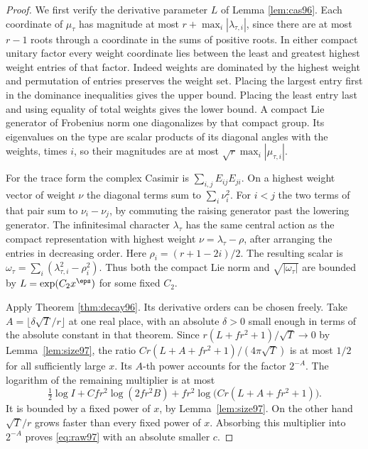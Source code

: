 \documentclass[a4paper,11pt]{article}
\theoremstyle{definition}
\theoremstyle{remark}
\numberwithin{equation}{section}
\begin{document}
\begin{proof}
We first verify the derivative parameter \(L\) of Lemma \ref{lem:cas96}. Each coordinate of \(\mu_\tau\) has magnitude at most
\(r+\max_i|\lambda_{\tau,i}|\), since there are at most \(r-1\)
roots through a coordinate in the sums of positive roots.
In either compact unitary factor every weight coordinate lies
between the least and greatest highest weight entries of that
factor. Indeed weights are dominated by the highest weight and
permutation of entries preserves the weight set. Placing the
largest entry first in the dominance inequalities gives the upper
bound. Placing the least entry last and using equality of total
weights gives the lower bound. A compact Lie generator of
Frobenius norm one diagonalizes by that compact group. Its
eigenvalues on the type are scalar products of its diagonal
angles with the weights, times \(i\), so their magnitudes are
at most \(\sqrt r\max_i|\mu_{\tau,i}|\).

For the trace form the complex Casimir is \(\sum_{i,j}E_{ij}E_{ji}\).
On a highest weight vector of weight \(\nu\) the diagonal terms
sum to \(\sum_i\nu_i^2\). For \(i<j\) the two terms of that pair
sum to \(\nu_i-\nu_j\), by commuting the raising generator past
the lowering generator. The infinitesimal character \(\lambda_\tau\)
has the same central action as the compact representation with
highest weight \(\nu=\lambda_\tau-\rho\), after arranging the
entries in decreasing order. Here \(\rho_i=(r+1-2i)/2\).
The resulting scalar is
\(\omega_\tau=\sum_i(\lambda_{\tau,i}^2-\rho_i^2)\).
Thus both the compact Lie norm and \(\sqrt{|\omega_\tau|}\) are
bounded by \(L=\exp(C_2 x^\eps)\) for some fixed \(C_2\).

Apply Theorem \ref{thm:decay96}.
Its derivative orders can be chosen freely. Take
\(A=\lfloor\delta\sqrt T/r\rfloor\) at one real place, with an
absolute \(\delta>0\) small enough in terms of the absolute
constant in that theorem. Since \(r(L+fr^2+1)/\sqrt T\to0\)
by Lemma~\ref{lem:size97}, the ratio
\(Cr(L+A+fr^2+1)/(4\pi\sqrt T)\) is at most \(1/2\) for all
sufficiently large \(x\). Its \(A\)-th power accounts for the
factor \(2^{-A}\). The logarithm of the remaining multiplier
is at most
\[
 \tfrac12\log I+Cfr^2\log(2fr^2B)
                +fr^2\log\big(Cr(L+A+fr^2+1)\big).
\]
It is bounded by a fixed power of \(x\), by Lemma~\ref{lem:size97}.
On the other hand \(\sqrt T/r\) grows faster than every fixed
power of \(x\). Absorbing this multiplier into \(2^{-A}\) proves
\eqref{eq:raw97} with an absolute smaller \(c\).
\end{proof}
\end{document}

